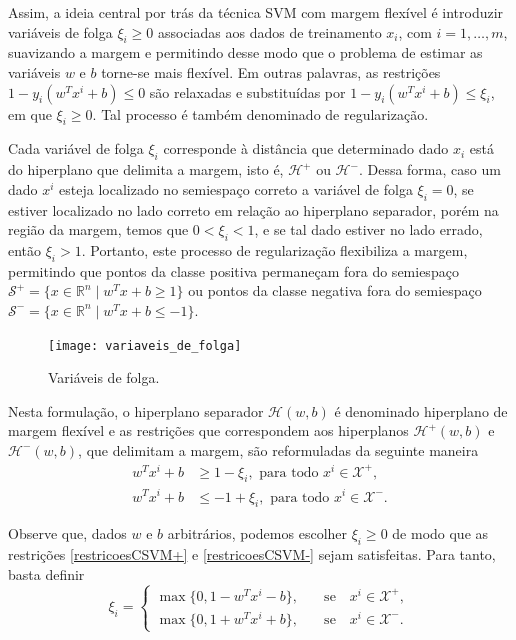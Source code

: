 \documentclass[12pt,a4paper]{scrartcl}
\def\Xset{\mathcal{X}}
\def\Hset{\mathcal{H}}
\def\RR{\mathds{R}}
\theoremstyle{definition}%
\begin{document}
Assim, a ideia central por trás da técnica SVM com margem flexível é introduzir variáveis de folga $\xi_{i} \geq 0$ associadas aos dados de treinamento $x_{i}$, com $i=1, \ldots , m$, suavizando a margem e permitindo desse modo que o problema de estimar as variáveis $w$ e $b$ torne-se mais flexível. Em outras palavras, as restrições $1-y_{i}(w^{T}x^{i} + b) \leq 0$ são relaxadas e substituídas por $1-y_{i}(w^{T}x^{i} + b) \leq \xi_{i} $, em que $\xi_{i} \geq 0$. Tal processo é também denominado de regularização.

Cada variável de folga $\xi_{i}$ corresponde à distância que determinado dado $x_{i}$ está do hiperplano que delimita a margem, isto é, $\Hset^{+}$ ou $\Hset^{-}$. Dessa forma, caso um dado $x^{i}$ esteja localizado no semiespaço correto a variável de folga $\xi_{i} = 0$, se estiver localizado no lado correto em relação ao hiperplano separador, porém na região da margem, temos que $0< \xi_{i} < 1$, e se tal dado estiver no lado errado, então $\xi_{i} >1$. Portanto, este processo de regularização flexibiliza a margem, permitindo que pontos da classe positiva permaneçam fora do semiespaço $\mathcal{S}^{+}=\{x\in \RR^n \mid w^{T}x+b\geq 1\}$ ou pontos da classe negativa fora do semiespaço $\mathcal{S}^{-}=\{x\in \RR^n \mid w^{T}x+b\leq -1\}$.

\begin{figure}[!ht] 
	\centering
	\texttt{[image: variaveis\_de\_folga]}
	\caption{Variáveis de folga. \label{fig:variaveis_de_folga}}
\end{figure}

Nesta formulação, o hiperplano separador $\Hset(w,b)$ é denominado hiperplano de margem flexível e as restrições que correspondem aos hiperplanos $\Hset^{+} (w,b)$ e $\Hset^{-} (w,b)$, que delimitam a margem, são reformuladas da seguinte maneira 
\begin{align}
w^{T}x^{i}+b &\geq 1 - \xi_{i} , \text{ para  todo } x^{i} \in \Xset^{+}, \label{restricoesCSVM+} \\
w^{T}x^{i}+b &\leq -1 +\xi_{i} , \text{ para  todo } x^{i} \in \Xset^{-}. \label{restricoesCSVM-}
\end{align}

Observe que, dados $w$ e $b$ arbitrários, podemos escolher $\xi_{i} \geq 0$ de modo que as restrições \eqref{restricoesCSVM+} e \eqref{restricoesCSVM-} sejam satisfeitas. Para tanto, basta definir
\[
\xi_{i} =  \left \{ \begin{array}{cc} \max\{0, 1-w^{T}x^{i}-b\}, & \quad \text{se} \quad x^{i} \in \Xset^{+}, \\
\max\{0, 1+w^{T}x^{i}+b\}, & \quad \text{se} \quad x^{i} \in \Xset^{-}.
\end{array} \right .
\]
 
\end{document}
